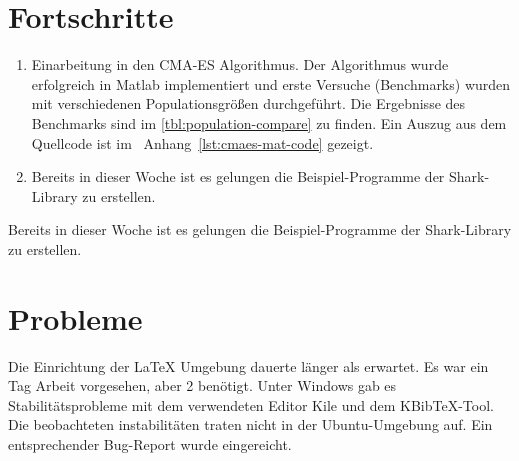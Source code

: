 \documentclass[a4paper,12pt,fleqn]{scrartcl}
\begin{document}
\section[Fortschritte]{Fortschritte}
\begin{enumerate}
 \item Einarbeitung in den CMA-ES Algorithmus. Der Algorithmus wurde erfolgreich
in Matlab
      implementiert und erste Versuche (Benchmarks) wurden mit verschiedenen Populationsgrößen durchgeführt. Die Ergebnisse des Benchmarks sind im \ref{tbl:population-compare} zu finden.
      Ein Auszug aus dem Quellcode ist im \ Anhang~\ref{lst:cmaes-mat-code} gezeigt.
 \item Bereits in dieser Woche ist es gelungen die Beispiel-Programme der Shark-Library zu erstellen.


\end{enumerate}

\cite{KALMANandSMOOTHING} Bereits in dieser Woche ist es gelungen die Beispiel-Programme der Shark-Library
zu erstellen.

\section[Probleme]{Probleme}
Die Einrichtung der \LaTeX{} Umgebung dauerte länger als erwartet. Es war ein
Tag Arbeit
vorgesehen, aber 2 benötigt.
Unter Windows gab es Stabilitätsprobleme mit dem verwendeten Editor Kile und dem KBibTeX-Tool. Die beobachteten instabilitäten traten nicht in der Ubuntu-Umgebung auf.
Ein entsprechender Bug-Report wurde eingereicht.



\newpage
{}

\end{document}
